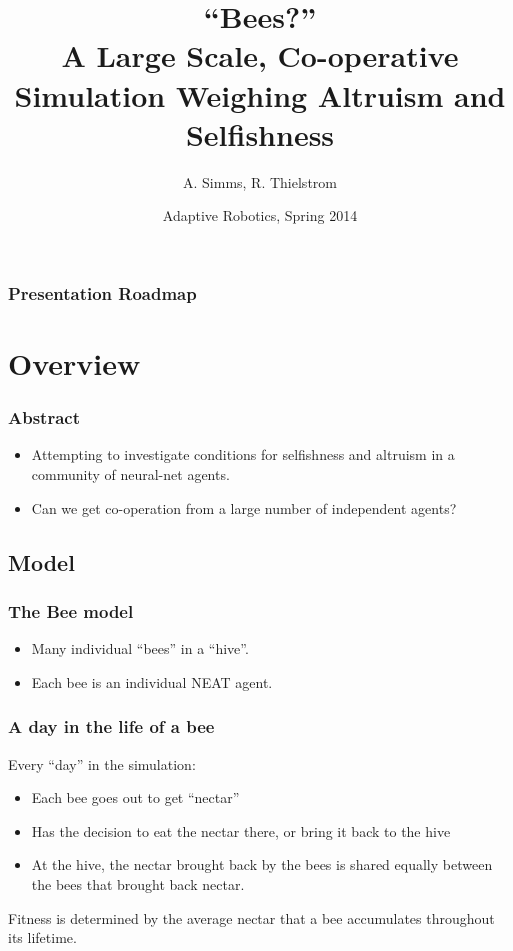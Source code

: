 \documentclass{beamer}
\title[Bees?]{``Bees?''\\ A Large Scale, Co-operative Simulation Weighing 
              Altruism and Selfishness}
\author{A. Simms, R. Thielstrom}
\institute{Swarthmore College}
\date{Adaptive Robotics, Spring 2014}
\begin{document}
  
  \begin{frame}[t]
    \titlepage
  \end{frame}


  \begin{frame}[t]\frametitle{Presentation Roadmap}
    \setcounter{tocdepth}{2}
    \tableofcontents
    \setcounter{tocdepth}{3}
  \end{frame}

  \section{Overview} %
  \label{sec:overview}

    \begin{frame}[c]\frametitle{Abstract}
      \begin{itemize}
        \item Attempting to investigate conditions for selfishness and altruism
              in a community of neural-net agents.
        \item Can we get co-operation from a large number of independent 
              agents?
      \end{itemize}
    \end{frame}

    \subsection{Model} %
    \label{sub:model}
      
      \begin{frame}[c]\frametitle{The Bee model}
        \begin{itemize}
          \item Many individual ``bees'' in a ``hive''.
          \item Each bee is an individual NEAT agent.
        \end{itemize}
      \end{frame}

    \begin{frame}[c]\frametitle{A day in the life of a bee}
      Every ``day'' in the simulation:
      \begin{itemize}
        \item Each bee goes out to get ``nectar''
        \item Has the decision to eat the nectar there, or bring it 
              back to the hive
        \item At the hive, the nectar brought back by the bees is 
              shared equally between the bees that brought back nectar.
      \end{itemize}
      Fitness is determined by the average nectar that a bee accumulates
      throughout its lifetime.
    \end{frame}
\end{document}
